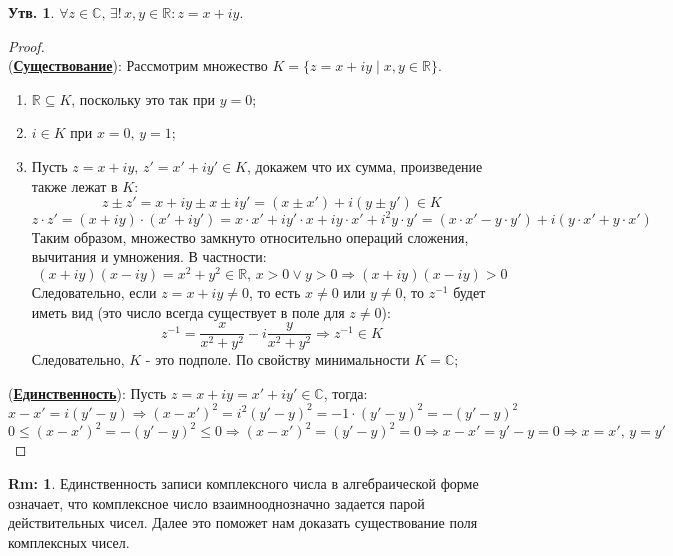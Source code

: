 \documentclass[12pt]{article}
\newcommand{\MR}{\mathbb{R}}
\newcommand{\MC}{\mathbb{C}}
\theoremstyle{definition}
\newtheorem{rem}{Rm:}
\newtheorem{prop}{Утв.}
\begin{document}
\begin{prop}
	$\forall z \in \MC, \, \exists! \, x,y \in \MR \colon z = x + iy$.
\end{prop}
\begin{proof}\hfill\\
	(\textbf{\uline{Существование}}): Рассмотрим множество $K = \{z = x + iy \mid x,y \in \MR\}$.
	\begin{enumerate}[label=\arabic*)]
		\item $\MR \subseteq K$, поскольку это так при $y = 0$;
		\item $i \in K$ при $x = 0,\, y =1$;
		\item Пусть $z = x + iy, \, z' = x' + iy' \in K$, докажем что их сумма, произведение также лежат в $K$:
		$$
			z\pm z' = x + iy \pm x \pm iy' = (x \pm x') + i(y \pm y') \in K
		$$
		$$
			z{\cdot}z' = (x + iy){\cdot}(x' + iy') = x{\cdot}x' + iy'{\cdot}x + iy{\cdot}x' + i^2y{\cdot}y' = (x{\cdot}x' - y{\cdot}y') + i(y{\cdot}x' + y{\cdot}x')
		$$
		Таким образом, множество замкнуто относительно операций сложения, вычитания и умножения. В частности:
		$$
			(x + iy)(x - iy) = x^2 + y^2 \in \MR, \, x > 0 \vee y  > 0 \Rightarrow (x + iy)(x - iy) > 0
		$$
		Следовательно, если $z = x + iy \neq 0$, то есть $x \neq 0$ или $y \neq 0$, то $z^{-1}$ будет иметь вид (это число всегда существует в поле для $z \neq 0$):
		$$
			z^{-1} = \dfrac{x}{x^2 + y^2} - i\dfrac{y}{x^2 + y^2} \Rightarrow z^{-1} \in K
		$$
		Следовательно, $K$ - это подполе. По свойству минимальности $K = \MC$;
	\end{enumerate}
	(\textbf{\uline{Единственность}}): Пусть $z = x + iy = x' + iy' \in \MC$, тогда:
	$$
		x - x' = i(y' - y) \Rightarrow (x - x')^2 = i^2(y' - y)^2 = -1{\cdot}(y' - y)^2 = -(y'-y)^2
	$$
	$$
		0 \leq (x - x')^2 = -(y'-y)^2 \leq 0 \Rightarrow (x - x')^2 = (y'-y)^2 = 0 \Rightarrow x -x' = y' - y = 0 \Rightarrow x = x', \, y = y'
	$$
\end{proof}
\begin{rem}
	Единственность записи комплексного числа в алгебраической форме означает, что комплексное число взаимнооднозначно задается парой действительных чисел. Далее это поможет нам доказать существование поля комплексных чисел.
\end{rem}
\end{document}
